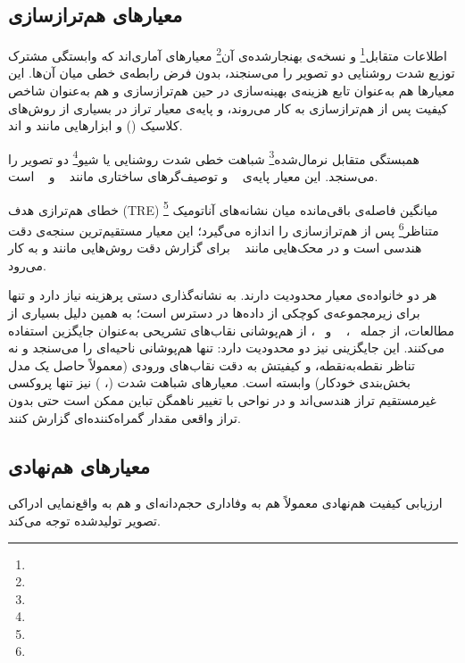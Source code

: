 \subsection*{معیارهای هم‌ترازسازی}


اطلاعات متقابل\footnote{} و نسخه‌ی بهنجارشده‌ی آن\footnote{} معیارهای آماری‌اند که وابستگی مشترک توزیع شدت روشنایی دو تصویر را می‌سنجند، بدون فرض رابطه‌ی خطی میان آن‌ها. این معیارها هم به‌عنوان تابع هزینه‌ی بهینه‌سازی در حین هم‌ترازسازی و هم به‌عنوان شاخص کیفیت پس از هم‌ترازسازی به کار می‌روند، و پایه‌ی معیار تراز در بسیاری از روش‌های کلاسیک (\cite{wells1996,studholme1999,mattes2001}) و ابزارهایی مانند  و اند.

همبستگی متقابل نرمال‌شده\footnote{} شباهت خطی شدت روشنایی یا شیو\footnote{} دو تصویر را می‌سنجد. این معیار پایه‌ی ~\cite{avants2008} و توصیف‌گرهای ساختاری مانند ~\cite{heinrich2012} و ~\cite{heinrich2013} است.

خطای هم‌ترازی هدف (TRE) \footnote{} میانگین فاصله‌ی باقی‌مانده میان نشانه‌های آناتومیک متناظر\footnote{} پس از هم‌ترازسازی را اندازه می‌گیرد؛ این معیار مستقیم‌ترین سنجه‌ی دقت هندسی است و در محک‌هایی مانند ~\cite{hering2023learn2reg} برای گزارش دقت روش‌هایی مانند  و  به کار می‌رود.

هر دو خانواده‌ی معیار محدودیت دارند.  به نشانه‌گذاری دستی پرهزینه نیاز دارد و تنها برای زیرمجموعه‌ی کوچکی از داده‌ها در دسترس است؛ به همین دلیل بسیاری از مطالعات، از جمله ~\cite{balakrishnan2019}، ~\cite{chen2022} و ~\cite{heinrich2013}، از هم‌پوشانی  نقاب‌های تشریحی به‌عنوان جایگزین استفاده می‌کنند. این جایگزینی نیز دو محدودیت دارد:  تنها هم‌پوشانی ناحیه‌ای را می‌سنجد و نه تناظر نقطه‌به‌نقطه، و کیفیتش به دقت نقاب‌های ورودی (معمولاً حاصل یک مدل بخش‌بندی خودکار) وابسته است. معیارهای شباهت شدت (، ) نیز تنها پروکسی غیرمستقیم تراز هندسی‌اند و در نواحی با تغییر ناهمگن تباین ممکن است حتی بدون تراز واقعی مقدار گمراه‌کننده‌ای گزارش کنند.

\subsection*{معیارهای هم‌نهادی}


ارزیابی کیفیت هم‌نهادی معمولاً هم به وفاداری حجم‌دانه‌ای و هم به واقع‌نمایی ادراکی تصویر تولیدشده توجه می‌کند.


